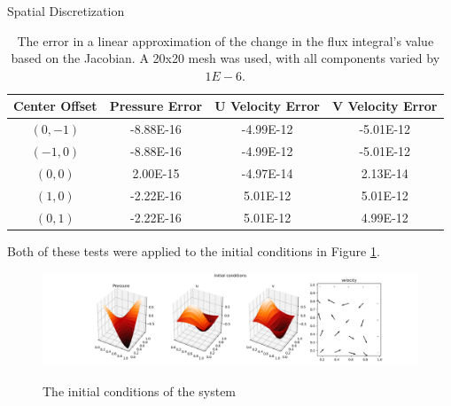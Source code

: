 \documentclass{article}
\begin{document}
\begin{section}{Spatial Discretization}
\begin{table}[ht]
  \begin{tabular}{|c|c|c|c|}
    \hline
    Center Offset & Pressure Error & U Velocity Error & V Velocity Error\\
    \hline
    $(0, -1)$     & -8.88E-16      & -4.99E-12        & -5.01E-12       \\
    $(-1, 0)$     & -8.88E-16      & -4.99E-12        & -5.01E-12       \\
    $(0, 0)$      &  2.00E-15      & -4.97E-14        &  2.13E-14       \\
    $(1, 0)$      & -2.22E-16      &  5.01E-12        &  5.01E-12       \\
    $(0, 1)$      & -2.22E-16      &  5.01E-12        &  4.99E-12       \\
    \hline
  \end{tabular}
  \label{jacobian}
  \caption{The error in a linear approximation of the change in the
    flux integral's value based on the Jacobian.
    A 20x20 mesh was used, with all components varied by $1E-6$.}
\end{table}
\end{section}

Both of these tests were applied to the initial conditions in Figure \ref{initial_conds}.
\begin{figure}[ht]
  \hspace{-30mm}
  \includegraphics[width=1.35\textwidth]{initial_conds/initial_conds.png}
  \label{initial_conds}
  \caption{The initial conditions of the system}
\end{figure}
\end{document}
